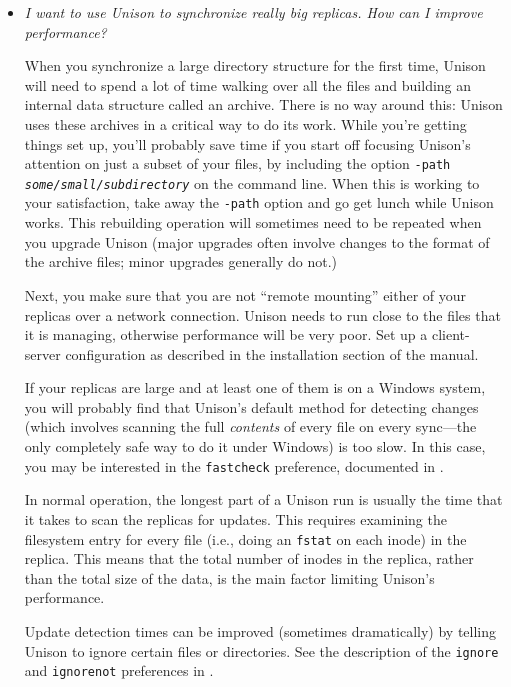 \begin{itemize}
\item {\em I want to use Unison to synchronize really big replicas.  How
  can I improve performance?}

When you synchronize a large directory structure for the first time,
Unison will need to spend a lot of time walking over all the files and
building an internal data structure called an archive.  There is no way
around this: Unison uses these archives in a critical way to do its work.
While you're getting things set up, you'll probably save time if you
start off focusing Unison's attention on just a subset of your files, by
including the option {\tt -path \it some/small/subdirectory} on the
command line.  When this is working to your satisfaction, take away the
\verb|-path| option and go get lunch while Unison works.  This rebuilding
operation will sometimes need to be repeated when you upgrade Unison
(major upgrades often involve changes to the format of the archive files;
minor upgrades generally do not.)

Next, you make sure that you are not ``remote mounting'' either of your
replicas over a network connection.  Unison needs to run close to the
files that it is managing, otherwise performance will be very poor.  Set
up a client-server configuration as described in the installation section
of the manual.

If your replicas are large and at least one of them is on a Windows
system, you will probably find that Unison's default method for detecting
changes (which involves scanning the full {\em contents} of every file on
every sync---the only completely safe way to do it under Windows) is too
slow.  In this case, you may be interested in the {\tt fastcheck}
preference, documented in .

In normal operation, the longest part of a Unison run is usually the time
that it takes to scan the replicas for updates.  This requires examining
the filesystem entry for every file (i.e., doing an {\tt fstat} on each
inode) in the replica.  This means that the total number of inodes in the
replica, rather than the total size of the data, is the main factor
limiting Unison's performance.

Update detection times can be improved (sometimes dramatically) by
telling Unison to ignore certain files or directories.  See the
description of the {\tt ignore} and {\tt ignorenot} preferences in
.


\end{itemize}
